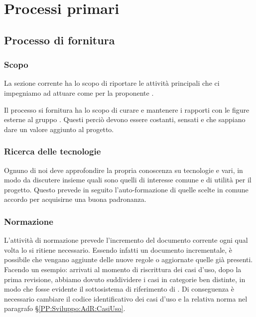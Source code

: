 \section{Processi primari}\label{ProcessiPrimari}

    \subsection{Processo di fornitura}\label{PP:Fornitura}	%

        \subsubsection{Scopo}\label{PP:Fornitura:Scopo}
		La sezione corrente ha lo scopo di riportare le attività principali che ci impegniamo ad attuare come  per la proponente \II. \par
        Il processo si fornitura ha lo scopo di curare e mantenere i rapporti con le figure esterne al gruppo \gruppo. Questi perciò devono essere costanti, sensati e che sappiano dare un valore aggiunto al progetto.

		\subsubsection{Ricerca delle tecnologie}
		Ognuno di noi deve approfondire la propria conoscenza su tecnologie e  vari, in modo da discutere insieme quali sono quelli di interesse comune e di utilità per il progetto. Questo prevede in seguito l'auto-formazione di quelle scelte in comune accordo per acquisirne una buona padronanza.

		\subsubsection{Normazione}\label{Normazione}
		L'attività di normazione prevede l'incremento del documento corrente ogni qual volta lo si ritiene necessario.
		Essendo infatti un documento incrementale, è possibile che vengano aggiunte delle nuove regole o aggiornate quelle già presenti.
		Facendo un esempio: arrivati al momento di riscrittura dei casi d'uso, dopo la prima revisione, abbiamo dovuto suddividere i casi in categorie ben distinte, in modo che fosse evidente il sottosistema di riferimento di \progetto.
		Di conseguenza è necessario cambiare il codice identificativo dei casi d'uso e la relativa norma nel paragrafo \S\ref{PP:Sviluppo:AdR:CasiUso}.
        
